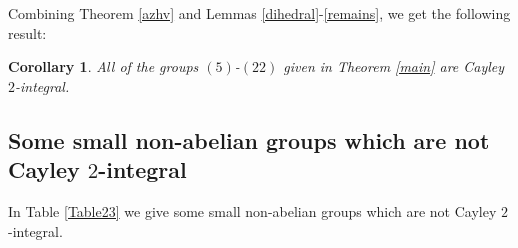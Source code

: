 \documentclass{amsart}
\newtheorem{core}[thm]{Corollary}
\def \leq {\leqslant}
\def\Aut{{\sf Aut}} \def\Inn{{\sf Inn}}\def\Core{{\sf Core}}
\def\Cay{{\sf Cay}} \def\Ker{{\sf Ker}}
\begin{document}
Combining Theorem \ref{azhv} and Lemmas \ref{dihedral}-\ref{remains}, we get the following result:
\begin{core}\label{coremain}
All of the groups $(5)$-$(22)$ given in Theorem \ref{main} are Cayley $2$-integral.
\end{core}

\subsection{Some small non-abelian groups which are not Cayley $2$-integral}
In Table \ref{Table23} we give some small non-abelian groups which are not Cayley $2$-integral.

	
\end{document}
